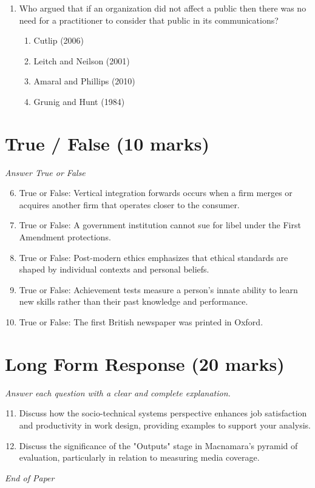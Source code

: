 \documentclass[12pt]{article}
\begin{document}
\begin{enumerate}[label=\arabic*.]
\begin{enumerate}[label=(\alph*)]
    \item Business to business
\end{enumerate}
\item Who argued that if an organization did not affect a public then there was no need for a practitioner to consider that public in its communications?
\begin{enumerate}[label=(\alph*)]
    \item Cutlip (2006)
    \item Leitch and Neilson (2001)
    \item Amaral and Phillips (2010)
    \item Grunig and Hunt (1984)
\end{enumerate}
\end{enumerate}

\section*{True / False (10 marks)}
\textit{Answer True or False}
\begin{enumerate}[label=\arabic*.]
\setcounter{enumi}{5}
\item True or False: Vertical integration forwards occurs when a firm merges or acquires another firm that operates closer to the consumer.
\item True or False: A government institution cannot sue for libel under the First Amendment protections.
\item True or False: Post-modern ethics emphasizes that ethical standards are shaped by individual contexts and personal beliefs.
\item True or False: Achievement tests measure a person's innate ability to learn new skills rather than their past knowledge and performance.
\item True or False: The first British newspaper was printed in Oxford.
\end{enumerate}

\section*{Long Form Response (20 marks)}
\textit{Answer each question with a clear and complete explanation.}
\begin{enumerate}[label=\arabic*.]
\setcounter{enumi}{10}
\item Discuss how the socio-technical systems perspective enhances job satisfaction and productivity in work design, providing examples to support your analysis.
\item Discuss the significance of the "Outputs" stage in Macnamara's pyramid of evaluation, particularly in relation to measuring media coverage.
\end{enumerate}

\vfill
\noindent\textit{End of Paper}
\end{document}
